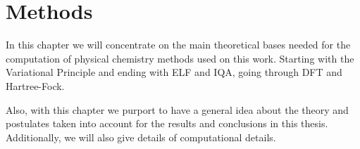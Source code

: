 \chapter{Methods}

In this chapter we will concentrate on the main
theoretical bases needed for the computation of physical chemistry methods
used on this work. Starting with the Variational Principle and ending with \gls{ELF}
and IQA, going through \gls{DFT} and Hartree-Fock.

Also, with this chapter we purport to have a general idea about the theory and
postulates taken into account for the results and conclusions in this thesis.
Additionally, we will also give details of computational details.

%
%
%
%
%
